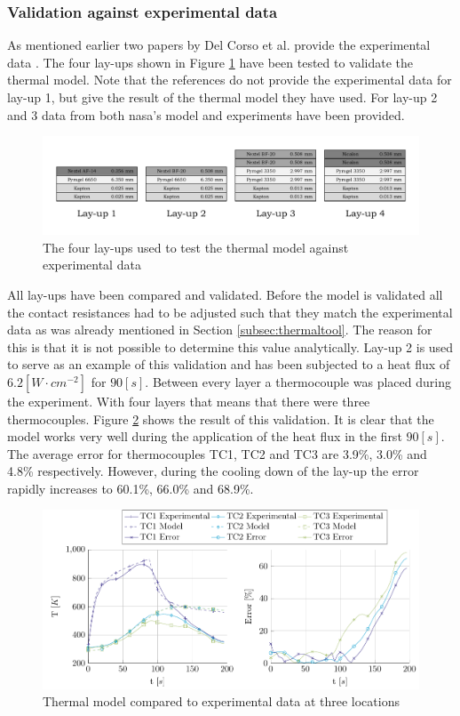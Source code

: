 \subsubsection{Validation against experimental data}
As mentioned earlier two papers by Del Corso et al. provide the experimental data \cite{Corso2009,Corso2011}. The four lay-ups shown in Figure \ref{fig:vallayup} have been tested to validate the thermal model. Note that the references do not provide the experimental data for lay-up 1, but give the result of the thermal model they have used. For lay-up 2 and 3 data from both \gls{nasa}'s model and experiments have been provided. 


\begin{figure}[h]
	\centering
	\includegraphics[width=\textwidth]{Figure/Thermal/vallayup.pdf}
	\caption{The four lay-ups used to test the thermal model against experimental data}
	\label{fig:vallayup}
\end{figure}

All lay-ups have been compared and validated. Before the model is validated all the contact resistances had to be adjusted such that they match the experimental data as was already mentioned in Section \ref{subsec:thermaltool}. The reason for this is that it is not possible to determine this value analytically. Lay-up 2 is used to serve as an example of this validation and has been subjected to a heat flux of $6.2 \left[W\cdot cm^{-2}\right]$ for $90 \left[s\right]$. Between every layer a thermocouple was placed during the experiment. With four layers that means that there were three thermocouples. Figure \ref{fig:plotvallay2} shows the result of this validation. It is clear that the model works very well during the application of the heat flux in the first $90 \left[s\right]$. The average error for thermocouples TC1, TC2 and TC3 are 3.9\%, 3.0\% and 4.8\% respectively. However, during the cooling down of the lay-up the error rapidly increases to 60.1\%, 66.0\% and 68.9\%.

\begin{figure}[H]
	\centering
	\includegraphics[width=\textwidth]{Figure/Thermal/plotvallay2.pdf}
	\caption{Thermal model compared to experimental data at three locations}
	\label{fig:plotvallay2}
\end{figure}

